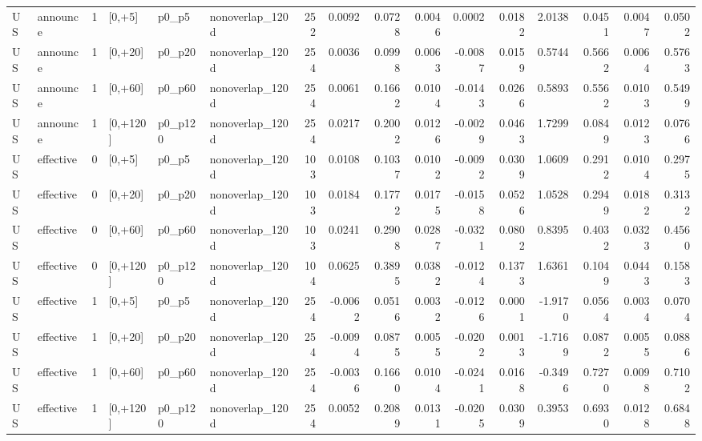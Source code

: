 \begin{tabular}{llrlllrrrrrrrrrr}
US & announce & 1 & [0,+5] & p0_p5 & nonoverlap_120d & 252 & 0.0092 & 0.0728 & 0.0046 & 0.0002 & 0.0182 & 2.0138 & 0.0451 & 0.0047 & 0.0502 \\
US & announce & 1 & [0,+20] & p0_p20 & nonoverlap_120d & 254 & 0.0036 & 0.0998 & 0.0063 & -0.0087 & 0.0159 & 0.5744 & 0.5662 & 0.0064 & 0.5763 \\
US & announce & 1 & [0,+60] & p0_p60 & nonoverlap_120d & 254 & 0.0061 & 0.1662 & 0.0104 & -0.0143 & 0.0266 & 0.5893 & 0.5562 & 0.0103 & 0.5499 \\
US & announce & 1 & [0,+120] & p0_p120 & nonoverlap_120d & 254 & 0.0217 & 0.2002 & 0.0126 & -0.0029 & 0.0463 & 1.7299 & 0.0849 & 0.0123 & 0.0766 \\
US & effective & 0 & [0,+5] & p0_p5 & nonoverlap_120d & 103 & 0.0108 & 0.1037 & 0.0102 & -0.0092 & 0.0309 & 1.0609 & 0.2912 & 0.0104 & 0.2975 \\
US & effective & 0 & [0,+20] & p0_p20 & nonoverlap_120d & 103 & 0.0184 & 0.1772 & 0.0175 & -0.0158 & 0.0526 & 1.0528 & 0.2949 & 0.0182 & 0.3132 \\
US & effective & 0 & [0,+60] & p0_p60 & nonoverlap_120d & 103 & 0.0241 & 0.2908 & 0.0287 & -0.0321 & 0.0802 & 0.8395 & 0.4032 & 0.0323 & 0.4560 \\
US & effective & 0 & [0,+120] & p0_p120 & nonoverlap_120d & 104 & 0.0625 & 0.3895 & 0.0382 & -0.0124 & 0.1373 & 1.6361 & 0.1049 & 0.0443 & 0.1583 \\
US & effective & 1 & [0,+5] & p0_p5 & nonoverlap_120d & 254 & -0.0062 & 0.0516 & 0.0032 & -0.0126 & 0.0001 & -1.9170 & 0.0564 & 0.0034 & 0.0704 \\
US & effective & 1 & [0,+20] & p0_p20 & nonoverlap_120d & 254 & -0.0094 & 0.0875 & 0.0055 & -0.0202 & 0.0013 & -1.7169 & 0.0872 & 0.0055 & 0.0886 \\
US & effective & 1 & [0,+60] & p0_p60 & nonoverlap_120d & 254 & -0.0036 & 0.1660 & 0.0104 & -0.0241 & 0.0168 & -0.3496 & 0.7270 & 0.0098 & 0.7102 \\
US & effective & 1 & [0,+120] & p0_p120 & nonoverlap_120d & 254 & 0.0052 & 0.2089 & 0.0131 & -0.0205 & 0.0309 & 0.3953 & 0.6930 & 0.0128 & 0.6848 \\
\bottomrule
\end{tabular}
